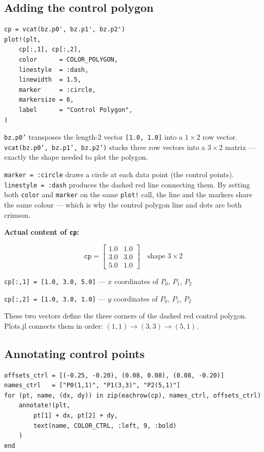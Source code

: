 \documentclass[12pt, a4paper]{article}
\newcommand{\cd}[1]{\texttt{#1}}
\begin{document}
\subsection{Adding the control polygon}

\begin{verbatim}
cp = vcat(bz.p0', bz.p1', bz.p2')
plot!(plt,
    cp[:,1], cp[:,2],
    color      = COLOR_POLYGON,
    linestyle  = :dash,
    linewidth  = 1.5,
    marker     = :circle,
    markersize = 6,
    label      = "Control Polygon",
)
\end{verbatim}

\cd{bz.p0'} transposes the length-2 vector \cd{[1.0, 1.0]}
into a $1 \times 2$ row vector.
\cd{vcat(bz.p0', bz.p1', bz.p2')} stacks three row
vectors into a $3 \times 2$ matrix --- exactly the shape
needed to plot the polygon.

\cd{marker = :circle} draws a circle at each data point
(the control points).
\cd{linestyle = :dash} produces the dashed red line
connecting them.
By setting both \cd{color} and \cd{marker} on the same
\cd{plot!} call, the line and the markers share the same
colour --- which is why the control polygon line and dots
are both crimson.

\begin{examplebox}
\textbf{Actual content of \cd{cp}:}

\[
  \cd{cp} =
  \begin{bmatrix}
    1.0 & 1.0 \\
    3.0 & 3.0 \\
    5.0 & 1.0
  \end{bmatrix}
  \quad \text{shape } 3 \times 2
\]

\cd{cp[:,1] = [1.0, 3.0, 5.0]} \quad --- $x$ coordinates of $P_0$, $P_1$, $P_2$

\cd{cp[:,2] = [1.0, 3.0, 1.0]} \quad --- $y$ coordinates of $P_0$, $P_1$, $P_2$

These two vectors define the three corners of the dashed
red control polygon.
Plots.jl connects them in order: $(1,1) \to (3,3) \to (5,1)$.
\end{examplebox}

\subsection{Annotating control points}

\begin{verbatim}
offsets_ctrl = [(-0.25, -0.20), (0.08, 0.08), (0.08, -0.20)]
names_ctrl   = ["P0(1,1)", "P1(3,3)", "P2(5,1)"]
for (pt, name, (dx, dy)) in zip(eachrow(cp), names_ctrl, offsets_ctrl)
    annotate!(plt,
        pt[1] + dx, pt[2] + dy,
        text(name, COLOR_CTRL, :left, 9, :bold)
    )
end
\end{verbatim}
\end{document}
